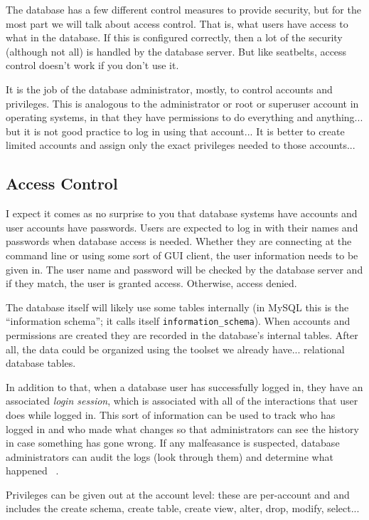 The database has a few different control measures to provide security, but for the most part we will talk about access control. That is, what users have access to what in the database. If this is configured correctly, then a lot of the security (although not all) is handled by the database server. But like seatbelts, access control doesn't work if you don't use it.

It is the job of the database administrator, mostly, to control accounts and privileges. This is analogous to the administrator or root or superuser account in operating systems, in that they have permissions to do everything and anything... but it is not good practice to log in using that account... It is better to create limited accounts and assign only the exact privileges needed to those accounts...

\subsection*{Access Control}

I expect it comes as no surprise to you that database systems have accounts and user accounts have passwords. Users are expected to log in with their names and passwords when database access is needed. Whether they are connecting at the command line or using some sort of GUI client, the user information needs to be given in. The user name and password will be checked by the database server and if they match, the user is granted access. Otherwise, access denied.

The database itself will likely use some tables internally (in MySQL this is the ``information schema''; it calls itself \texttt{information\_schema}). When accounts and permissions are created they are recorded in the database's internal tables. After all, the data could be organized using the toolset we already have... relational database tables. 

In addition to that, when a database user has successfully logged in, they have an associated \textit{login session}, which is associated with all of the interactions that user does while logged in. This sort of information can be used to track who has logged in and who made what changes so that administrators can see the history in case something has gone wrong. If any malfeasance is suspected, database administrators can audit the logs (look through them) and determine what happened ~\cite{fds}.  

Privileges can be given out at the account level: these are per-account and and includes the create schema, create table, create view, alter, drop, modify, select... 

